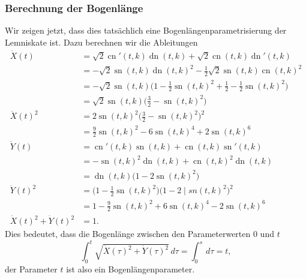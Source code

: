 \subsubsection{Berechnung der Bogenlänge}
Wir zeigen jetzt, dass dies tatsächlich eine Bogenlängenparametrisierung
der Lemniskate ist.
Dazu berechnen wir die Ableitungen
\begin{align*}
\dot{X}(t)
&=
\sqrt{2}\operatorname{cn}'(t,k)\operatorname{dn}(t,k)
+
\sqrt{2}\operatorname{cn}(t,k)\operatorname{dn}'(t,k)
\\
&=
-\sqrt{2}\operatorname{sn}(t,k)\operatorname{dn}(t,k)^2
-\frac12\sqrt{2}\operatorname{sn}(t,k)\operatorname{cn}(t,k)^2
\\
&=
-\sqrt{2}\operatorname{sn}(t,k)\bigl(
1-{\textstyle\frac12}\operatorname{sn}(t,k)^2
+{\textstyle\frac12}-{\textstyle\frac12}\operatorname{sn}(t,k)^2
\bigr)
\\
&=
\sqrt{2}\operatorname{sn}(t,k)
\bigl(
{\textstyle \frac32}-\operatorname{sn}(t,k)^2
\bigr)
\\
\dot{X}(t)^2
&=
2\operatorname{sn}(t,k)^2
\bigl(
{\textstyle \frac32}-\operatorname{sn}(t,k)^2
\bigr)^2
\\
&=
{\textstyle\frac{9}{2}}\operatorname{sn}(t,k)^2
-
6\operatorname{sn}(t,k)^4
+2\operatorname{sn}(t,k)^6
\\
\dot{Y}(t)
&=
\operatorname{cn}'(t,k)\operatorname{sn}(t,k)
+
\operatorname{cn}(t,k)\operatorname{sn}'(t,k)
\\
&=
-\operatorname{sn}(t,k)^2
\operatorname{dn}(t,k)
+\operatorname{cn}(t,k)^2
\operatorname{dn}(t,k)
\\
&=
\operatorname{dn}(t,k)\bigl(1-2\operatorname{sn}(t,k)^2\bigr)
\\
\dot{Y}(t)^2
&=
\bigl(1-{\textstyle\frac12}\operatorname{sn}(t,k)^2\bigr)
\bigl(1-2\operatorname|{sn}(t,k)^2\bigr)^2
\\
&=
1-{\textstyle\frac{9}{2}}\operatorname{sn}(t,k)^2
+6\operatorname{sn}(t,k)^4
-2\operatorname{sn}(t,k)^6
\\
\dot{X}(t)^2 + \dot{Y}(t)^2
&=
1.
\end{align*}
Dies bedeutet, dass die Bogenlänge zwischen den Parameterwerten $0$ und $t$
\[
\int_0^t
\sqrt{\dot{X}(\tau)^2 + \dot{Y}(\tau)^2}
\,d\tau
=
\int_0^s\,d\tau
=
t,
\]
der Parameter $t$ ist also ein Bogenlängenparameter.

%
%

